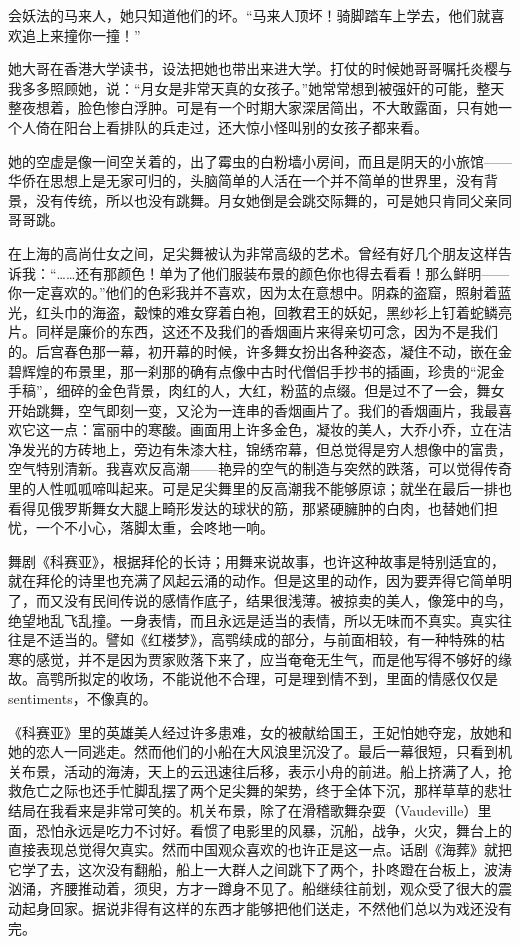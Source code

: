\par 会妖法的马来人，她只知道他们的坏。“马来人顶坏！骑脚踏车上学去，他们就喜欢追上来撞你一撞！”
\par 她大哥在香港大学读书，设法把她也带出来进大学。打仗的时候她哥哥嘱托炎樱与我多多照顾她，说：“月女是非常天真的女孩子。”她常常想到被强奸的可能，整天整夜想着，脸色惨白浮肿。可是有一个时期大家深居简出，不大敢露面，只有她一个人倚在阳台上看排队的兵走过，还大惊小怪叫别的女孩子都来看。
\par 她的空虚是像一间空关着的，出了霉虫的白粉墙小房间，而且是阴天的小旅馆——华侨在思想上是无家可归的，头脑简单的人活在一个并不简单的世界里，没有背景，没有传统，所以也没有跳舞。月女她倒是会跳交际舞的，可是她只肯同父亲同哥哥跳。
\par 在上海的高尚仕女之间，足尖舞被认为非常高级的艺术。曾经有好几个朋友这样告诉我：“……还有那颜色！单为了他们服装布景的颜色你也得去看看！那么鲜明——你一定喜欢的。”他们的色彩我并不喜欢，因为太在意想中。阴森的盗窟，照射着蓝光，红头巾的海盗，觳悚的难女穿着白袍，回教君王的妖妃，黑纱衫上钉着蛇鳞亮片。同样是廉价的东西，这还不及我们的香烟画片来得亲切可念，因为不是我们的。后宫春色那一幕，初开幕的时候，许多舞女扮出各种姿态，凝住不动，嵌在金碧辉煌的布景里，那一刹那的确有点像中古时代僧侣手抄书的插画，珍贵的“泥金手稿”，细碎的金色背景，肉红的人，大红，粉蓝的点缀。但是过不了一会，舞女开始跳舞，空气即刻一变，又沦为一连串的香烟画片了。我们的香烟画片，我最喜欢它这一点：富丽中的寒酸。画面用上许多金色，凝妆的美人，大乔小乔，立在洁净发光的方砖地上，旁边有朱漆大柱，锦绣帘幕，但总觉得是穷人想像中的富贵，空气特别清新。我喜欢反高潮——艳异的空气的制造与突然的跌落，可以觉得传奇里的人性呱呱啼叫起来。可是足尖舞里的反高潮我不能够原谅；就坐在最后一排也看得见俄罗斯舞女大腿上畸形发达的球状的筋，那紧硬臃肿的白肉，也替她们担忧，一个不小心，落脚太重，会咚地一响。
\par 舞剧《科赛亚》，根据拜伦的长诗；用舞来说故事，也许这种故事是特别适宜的，就在拜伦的诗里也充满了风起云涌的动作。但是这里的动作，因为要弄得它简单明了，而又没有民间传说的感情作底子，结果很浅薄。被掠卖的美人，像笼中的鸟，绝望地乱飞乱撞。一身表情，而且永远是适当的表情，所以无味而不真实。真实往往是不适当的。譬如《红楼梦》，高鹗续成的部分，与前面相较，有一种特殊的枯寒的感觉，并不是因为贾家败落下来了，应当奄奄无生气，而是他写得不够好的缘故。高鹗所拟定的收场，不能说他不合理，可是理到情不到，里面的情感仅仅是sentiments，不像真的。
\par 《科赛亚》里的英雄美人经过许多患难，女的被献给国王，王妃怕她夺宠，放她和她的恋人一同逃走。然而他们的小船在大风浪里沉没了。最后一幕很短，只看到机关布景，活动的海涛，天上的云迅速往后移，表示小舟的前进。船上挤满了人，抢救危亡之际也还手忙脚乱摆了两个足尖舞的架势，终于全体下沉，那样草草的悲壮结局在我看来是非常可笑的。机关布景，除了在滑稽歌舞杂耍（Vaudeville）里面，恐怕永远是吃力不讨好。看惯了电影里的风暴，沉船，战争，火灾，舞台上的直接表现总觉得欠真实。然而中国观众喜欢的也许正是这一点。话剧《海葬》就把它学了去，这次没有翻船，船上一大群人之间跳下了两个，扑咚蹬在台板上，波涛汹涌，齐腰推动着，须臾，方才一蹲身不见了。船继续往前划，观众受了很大的震动起身回家。据说非得有这样的东西才能够把他们送走，不然他们总以为戏还没有完。
